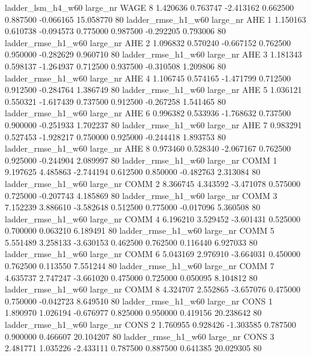   ladder_lsm_h4_w60   large_nr     WAGE                 8  1.420636  0.763747  -2.413162 0.662500 0.887500 -0.066165   15.058770 80
 ladder_rmse_h1_w60   large_nr      AHE                 1  1.150163  0.610738  -0.094573 0.775000 0.987500 -0.292205    0.793006 80
 ladder_rmse_h1_w60   large_nr      AHE                 2  1.096832  0.570240  -0.667152 0.762500 0.950000 -0.282629    0.960710 80
 ladder_rmse_h1_w60   large_nr      AHE                 3  1.181343  0.598137  -1.264937 0.712500 0.937500 -0.310508    1.209806 80
 ladder_rmse_h1_w60   large_nr      AHE                 4  1.106745  0.574165  -1.471799 0.712500 0.912500 -0.284764    1.386749 80
 ladder_rmse_h1_w60   large_nr      AHE                 5  1.036121  0.550321  -1.617439 0.737500 0.912500 -0.267258    1.541465 80
 ladder_rmse_h1_w60   large_nr      AHE                 6  0.996382  0.533936  -1.768632 0.737500 0.900000 -0.251933    1.702237 80
 ladder_rmse_h1_w60   large_nr      AHE                 7  0.983291  0.527453  -1.928217 0.750000 0.925000 -0.244418    1.893753 80
 ladder_rmse_h1_w60   large_nr      AHE                 8  0.973460  0.528340  -2.067167 0.762500 0.925000 -0.244904    2.089997 80
 ladder_rmse_h1_w60   large_nr     COMM                 1  9.197625  4.485863  -2.744194 0.612500 0.850000 -0.482763    2.313084 80
 ladder_rmse_h1_w60   large_nr     COMM                 2  8.366745  4.343592  -3.471078 0.575000 0.725000 -0.207743    4.185869 80
 ladder_rmse_h1_w60   large_nr     COMM                 3  7.152239  3.886610  -3.582648 0.512500 0.775000 -0.017096    5.360508 80
 ladder_rmse_h1_w60   large_nr     COMM                 4  6.196210  3.529452  -3.601431 0.525000 0.700000  0.063210    6.189491 80
 ladder_rmse_h1_w60   large_nr     COMM                 5  5.551489  3.258133  -3.630153 0.462500 0.762500  0.116440    6.927033 80
 ladder_rmse_h1_w60   large_nr     COMM                 6  5.043169  2.976910  -3.664031 0.450000 0.762500  0.113550    7.551244 80
 ladder_rmse_h1_w60   large_nr     COMM                 7  4.635737  2.747247  -3.661020 0.475000 0.725000  0.050095    8.104812 80
 ladder_rmse_h1_w60   large_nr     COMM                 8  4.324707  2.552865  -3.657076 0.475000 0.750000 -0.042723    8.649510 80
 ladder_rmse_h1_w60   large_nr     CONS                 1  1.890970  1.026194  -0.676977 0.825000 0.950000  0.419156   20.238642 80
 ladder_rmse_h1_w60   large_nr     CONS                 2  1.760955  0.928426  -1.303585 0.787500 0.900000  0.466607   20.104207 80
 ladder_rmse_h1_w60   large_nr     CONS                 3  2.481771  1.035226  -2.433111 0.787500 0.887500  0.641385   20.029305 80
